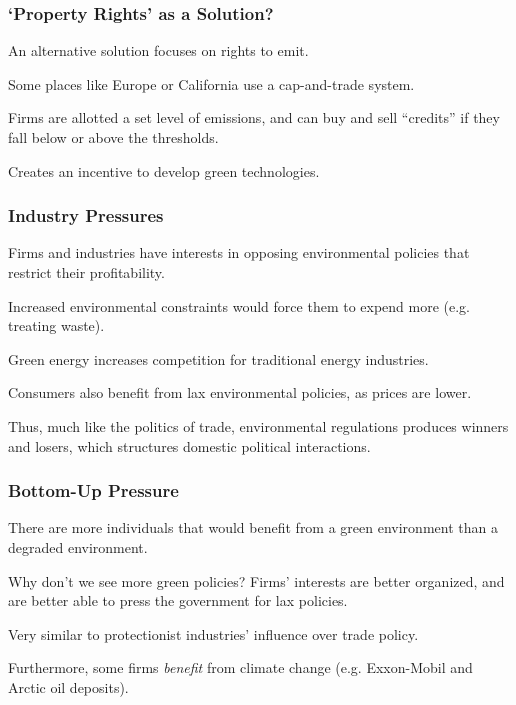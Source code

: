\documentclass[handout]{beamer}
\begin{document}
\begin{frame} 
	\frametitle{\LARGE{`Property Rights' as a Solution?}}
	\begin{itemize}
		\large{
			\item An alternative solution focuses on rights to emit. \pause
			
			\item Some places like Europe or California use a cap-and-trade system. \pause
			
			\item Firms are allotted a set level of emissions, and can buy and sell ``credits'' if they fall below or above the thresholds. \pause
			
			\item Creates an incentive to develop green technologies.
		}
	\end{itemize}
\end{frame}

\begin{frame} 
	\frametitle{\LARGE{Industry Pressures}}
	\begin{itemize}
		\large{
			\item Firms and industries have interests in opposing environmental policies that restrict their profitability. \pause
			
			\item Increased environmental constraints would force them to expend more (e.g. treating waste). \pause
			
			\item Green energy increases competition for traditional energy industries. \pause
			
			\item Consumers also benefit from lax environmental policies, as prices are lower. \pause 
			
			\item Thus, much like the politics of trade, environmental regulations produces winners and losers, which structures domestic political interactions.
		}
	\end{itemize}
\end{frame}

\begin{frame} 
	\frametitle{\LARGE{Bottom-Up Pressure}}
	\begin{itemize}
		\large{
			\item There are more individuals that would benefit from a green environment than a degraded environment. \pause
			
			\item Why don't we see more green policies? \pause Firms' interests are better organized, and are better able to press the government for lax policies. \pause
			
			\item Very similar to protectionist industries' influence over trade policy. \pause
			
			\item Furthermore, some firms \textit{benefit} from climate change (e.g. Exxon-Mobil and Arctic oil deposits). 
			
		}
	\end{itemize}
\end{frame}
\end{document}
